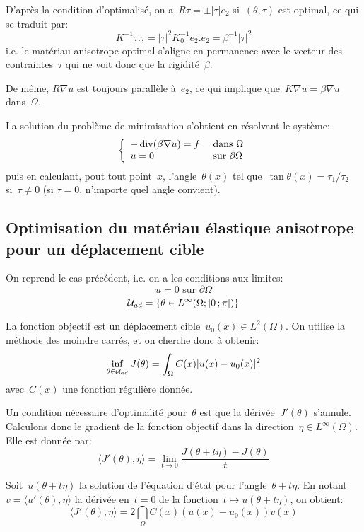 \medskip
D'après la condition d'optimalisé, on a~$R\tau=\pm|\tau|e_2$ si~$(\theta,\tau)$ est optimal, ce qui se traduit par:
\[ K^{-1}\tau.\tau = |\tau|^2K_0^{-1}e_2.e_2=\beta^{-1}|\tau|^2 \]
i.e. le matériau anisotrope optimal s'aligne en permanence avec le vecteur des contraintes~$\tau$ qui ne voit donc que la rigidité~$\beta$.

De même, $R\nabla u$ est toujours parallèle à~$e_2$, ce qui implique que~$K\nabla u=\beta\nabla u$ dans~$\Omega$.

La solution du problème de minimisation s'obtient en résolvant le système:
\[\left\{\begin{array}{ll} -\operatorname{div}(\beta\nabla u)=f &\text{ dans }\Omega\\ u=0&\text{ sur }\partial\Omega \end{array}\right. \]
puis en calculant, pout tout point~$x$, l'angle~$\theta(x)$ tel que~$\tan\theta(x)=\tau_1/\tau_2$ si~$\tau\ne0$ (si $\tau=0$, n'importe quel angle convient).


\medskip
\subsection{Optimisation du matériau élastique anisotrope pour un déplacement cible}

On reprend le cas précédent, i.e. on a les conditions aux limites:
\[ u=0 \text{ sur }\partial\Omega \]
\[ \mathcal{U}_{ad}=\{\theta\in L^\infty(\Omega;\mathopen{[}0\,;\pi\mathclose{]}) \} \]

La fonction objectif est un déplacement cible~$u_0(x)\in L^2(\Omega)$. On utilise la méthode des moindre carrés, et on cherche donc à obtenir:
\[ \colorblue \inf_{\theta\in\mathcal{U}_{ad}} J(\theta)=\dint_\Omega C(x)|u(x)-u_0(x)|^2 \]
avec~$C(x)$ une fonction régulière donnée.

\medskip
Un condition nécessaire d'optimalité pour~$\theta$ est que la dérivée~$J'(\theta)$ s'annule.
Calculons donc le gradient de la fonction objectif dans la direction~$\eta\in L^\infty(\Omega)$. Elle est donnée par:
\[ \langle J'(\theta),\eta\rangle = \lim_{t\rightarrow0} \dfrac{J(\theta+t\eta)-J(\theta)}{t} \]

Soit~$u(\theta+t\eta)$ la solution de l'équation d'état pour l'angle~$\theta+t\eta$. En notant~$v=\langle u'(\theta),\eta\rangle$ la dérivée en~$t=0$ de la fonction~$t \mapsto u(\theta+t\eta)$, on obtient:
\[ \langle J'(\theta),\eta\rangle = 2\dint_\Omega C(x)(u(x)-u_0(x))v(x) \]

